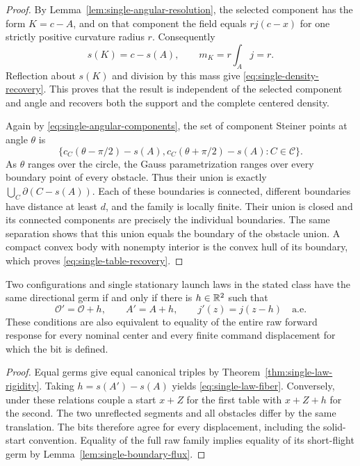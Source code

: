 \begin{proof}
By Lemma~\ref{lem:single-angular-resolution}, the selected component
has the form $K=c-A$, and on that component the field equals
$rj(c-x)$ for one strictly positive curvature radius $r$.
Consequently
\[
 s(K)=c-s(A),\qquad m_K=r\int_Aj=r.
\]
Reflection about $s(K)$ and division by this mass give
\eqref{eq:single-density-recovery}.  This proves that the result is
independent of the selected component and angle and recovers both
the support and the complete centered density.

Again by \eqref{eq:single-angular-components}, the set of component
Steiner points at angle $\theta$ is
\[
 \{c_C(\theta-\pi/2)-s(A),
               c_C(\theta+\pi/2)-s(A):C\in\mathcal C\}.
\]
As $\theta$ ranges over the circle, the Gauss parametrization ranges
over every boundary point of every obstacle.  Thus their union is
exactly $\bigcup_C\partial(C-s(A))$.
Each of these boundaries is connected, different boundaries have
distance at least $d$, and the family is locally finite.
Their union is closed and its connected components are precisely
the individual boundaries.  The same separation shows that this
union equals the boundary of the obstacle union.  A compact convex
body with nonempty interior is the convex hull of its boundary,
which proves \eqref{eq:single-table-recovery}.
\end{proof}

\begin{corollary}
\label{cor:single-law-fiber}
Two configurations and single stationary launch laws in the stated
class have the same directional germ if and only if there is
$h\in\mathbb R^2$ such that
\begin{equation}\label{eq:single-law-fiber}
 \mathcal O'=\mathcal O+h,\qquad A'=A+h,
                         \qquad j'(z)=j(z-h)\quad\text{a.e.}
\end{equation}
These conditions are also equivalent to equality of the entire
raw forward response for every nominal center and every finite
command displacement for which the bit is defined.
\end{corollary}
\begin{proof}
Equal germs give equal canonical triples by
Theorem~\ref{thm:single-law-rigidity}.  Taking
$h=s(A')-s(A)$ yields \eqref{eq:single-law-fiber}.
Conversely, under these relations couple a start $x+Z$ for the first
table with $x+Z+h$ for the second.  The two unreflected segments and
all obstacles differ by the same translation.  The bits therefore
agree for every displacement, including the solid-start convention.
Equality of the full raw family implies equality of its short-flight
germ by Lemma~\ref{lem:single-boundary-flux}.
\end{proof}


